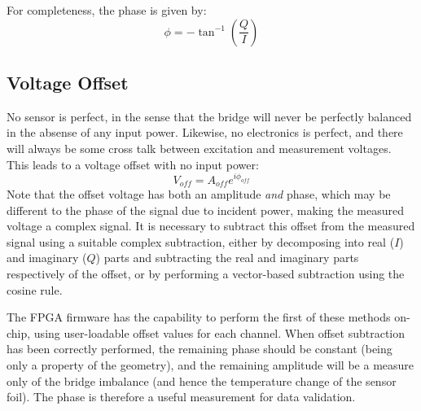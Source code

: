\documentclass[12pt,a4paper]{article}
\begin{document}
For completeness, the phase is given by:
\begin{equation}
  \label{equ:phi}
  \phi = -\tan^{-1}\left(\frac{Q}{I}\right)
\end{equation}

\subsection{Voltage Offset}
No sensor is perfect, in the sense that the bridge will never be perfectly balanced in the absense of any input power. Likewise, no electronics is perfect, and there will always be some cross talk between excitation and measurement voltages. This leads to a voltage offset with no input power:
\begin{equation}
  \label{equ:voff}
  V_{off} = A_{off}e^{i\phi_{off}}
\end{equation}
Note that the offset voltage has both an amplitude \textit{and} phase, which may be different to the phase of the signal due to incident power, making the measured voltage a complex signal. It is necessary to subtract this offset from the measured signal using a suitable complex subtraction, either by decomposing into real ($I$) and imaginary ($Q$) parts and subtracting the real and imaginary parts respectively of the offset, or by performing a vector-based subtraction using the cosine rule.

The FPGA firmware has the capability to perform the first of these methods on-chip, using user-loadable offset values for each channel. When offset subtraction has been correctly performed, the remaining phase should be constant (being only a property of the geometry), and the remaining amplitude will be a measure only of the bridge imbalance (and hence the temperature change of the sensor foil). The phase is therefore a useful measurement for data validation.
\end{document}
